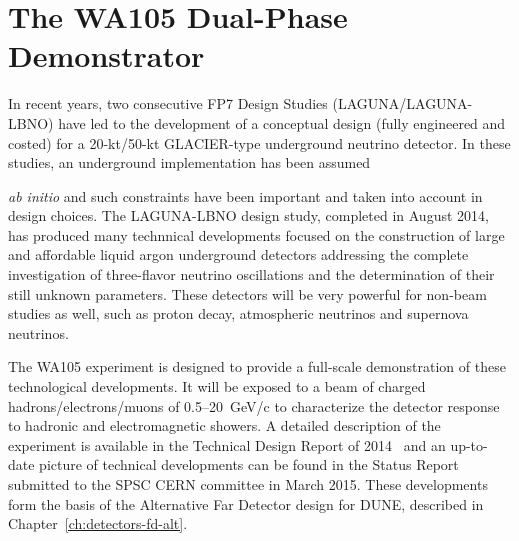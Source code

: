 \section{The WA105 Dual-Phase Demonstrator}
\label{sec:proto-cern-double}

In recent years, two consecutive FP7 Design Studies
(LAGUNA/LAGUNA-LBNO) have led to the development of a conceptual
design (fully engineered and costed) for a 20-kt/50-kt GLACIER-type
underground neutrino detector. In these studies, an underground
implementation has been assumed {\textit{ab initio} 
and such constraints have been important and taken into account in
design choices. The LAGUNA-LBNO design study, completed in August
2014, has produced many technnical developments focused on the
construction of large and affordable liquid argon underground
detectors addressing the complete investigation of three-flavor
neutrino oscillations and the determination of their still unknown
parameters.
%
These detectors will be very powerful for non-beam studies as well,
such as proton decay, atmospheric neutrinos and supernova neutrinos.

The WA105 experiment is designed to provide a full-scale demonstration
of these technological developments. It will be exposed to a beam of
charged hadrons/electrons/muons of 0.5--20~GeV/c to characterize the
detector response to hadronic and electromagnetic showers.  A detailed
description of the experiment is available in the Technical Design
Report of 2014~\cite{WA105_TDR} and an up-to-date picture of
technical developments can be found in the Status Report\cite{WA105_SREP}
submitted to the SPSC CERN committee in March
2015. These developments form the basis of the
Alternative Far Detector design for DUNE, described in
Chapter~\ref{ch:detectors-fd-alt}.


}
